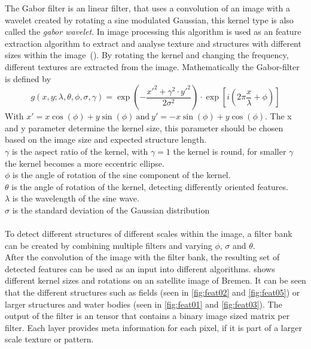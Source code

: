\documentclass[12pt,a4paper, english]{article}
\begin{document}
The Gabor filter is an linear filter, that uses a convolution of an image with a wavelet created by rotating a sine modulated Gaussian, this kernel type is also called the \textit{gabor wavelet}. 
In image processing this algorithm is used as an feature extraction algorithm to extract and analyse texture and structures with different sizes within the image~(\cite{Cerdan1993}). 
By rotating the kernel and changing the frequency, different textures are extracted from the image.
%
Mathematically the Gabor-filter is defined by
    \begin{equation}
      g(x,y; \lambda, \theta, \phi, \sigma, \gamma) = \exp \left(- \frac{x'^2 + \gamma^2\cdot y'^2}{2\sigma^2}\right) \cdot \exp \left[i \left(2\pi\frac{x}{\lambda} + \phi \right)\right] 
    \end{equation}
    With $ x' = x \cos(\phi) + y \sin(\phi)~\text{and}~y' = -x \sin(\phi) + y \cos(\phi)$.
%
    The x and y parameter determine the kernel size, this parameter should be chosen based on the image size and expected structure length.\\
    $\gamma$ is the aspect ratio of the kernel, with $\gamma = 1$ the kernel is round, for smaller $\gamma$ the kernel becomes a more eccentric ellipse.\\
    $\phi$ is the angle of rotation of the sine component of the kernel. \\
    $\theta$ is the angle of rotation of the kernel, detecting differently oriented features.\\
    $\lambda$ is the wavelength of the sine wave. \\
    $\sigma$ is the standard deviation of the Gaussian distribution\\ \\
%
%    
%
    To detect different structures of different scales within the image, a filter bank can be created by combining multiple filters and varying $\phi$, $\sigma$ and $\theta$.\\
%
    After the convolution of the image with the filter bank, the resulting set of detected features can be used as an input into different algorithms.
     shows different kernel sizes and rotations on an satellite image of Bremen. 
    It can be seen that the different structures such as fields (seen in \cref{fig:feat02} and \cref{fig:feat05}) or larger structures and water bodies (seen in \cref{fig:feat01} and \cref{fig:feat03}).
    The output of the filter is an tensor that contains a binary image sized matrix per filter. Each layer provides meta information for each pixel, if it is part of a larger scale texture or pattern. 
\end{document}
